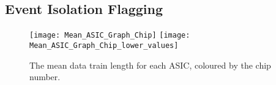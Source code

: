 \subsection{Event Isolation Flagging} %
\label{app:event_isolation_flagging}

\begin{figure}[h]
	\centering
	\texttt{[image: Mean\_ASIC\_Graph\_Chip]}
	\texttt{[image: Mean\_ASIC\_Graph\_Chip\_lower\_values]}
	\caption{The mean data train length for each ASIC, coloured by the chip number.}
\end{figure}

